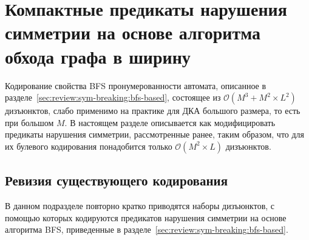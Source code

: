 
\section{Компактные предикаты нарушения симметрии на основе алгоритма обхода графа в ширину} 
\label{sec:space:tight}

Кодирование свойства BFS пронумерованности автомата, описанное в разделе~\ref{sec:review:sym-breaking:bfs-based}, состоящее из $\mathcal{O}\left(M^{3} + M^{2} \times L^{2}\right)$ дизъюнктов, слабо применимо на практике для ДКА большого размера, то есть при большом $M$. 
В настоящем разделе описывается как модифицировать предикаты нарушения симметрии, рассмотренные ранее, таким образом, что для их булевого кодирования понадобится только $\mathcal{O}\left(M^{2} \times L\right)$ дизъюнктов.



\subsection{Ревизия существующего кодирования}
\label{sec:space:tight:review}

В данном подразделе повторно кратко приводятся наборы дизъюнктов, с помощью которых кодируются предикатов нарушения симметрии на основе алгоритма BFS, приведенные в разделе~\ref{sec:review:sym-breaking:bfs-based}.

